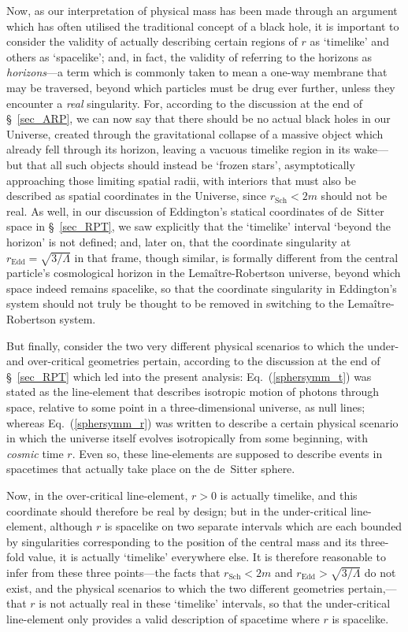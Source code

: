 Now, as our interpretation of physical mass has been made through an argument which has often utilised the traditional concept of a black hole, it is important to consider the validity of actually describing certain regions of $r$ as `timelike' and others as `spacelike'; and, in fact, the validity of referring to the horizons as \textit{horizons}---a term which is commonly taken to mean a one-way membrane that may be traversed, beyond which particles must be drug ever further, unless they encounter a \textit{real} singularity. For, according to the discussion at the end of \S~\ref{sec_ARP}, we can now say that there should be no actual black holes in our Universe, created through the gravitational collapse of a massive object which already fell through its horizon, leaving a vacuous timelike region in its wake---but that all such objects should instead be `frozen stars', asymptotically approaching those limiting spatial radii, with interiors that must also be described as spatial coordinates in the Universe, since $r_{\mathrm{Sch}}<2m$ should not be real. As well, in our discussion of Eddington's statical coordinates of de~Sitter space in \S~\ref{sec_RPT}, we saw explicitly that the `timelike' interval `beyond the horizon' is not defined; and, later on, that the coordinate singularity at $r_{\mathrm{Edd}}=\sqrt{3/\Lambda}$ in that frame, though similar, is formally different from the central particle's cosmological horizon in the Lema\^{i}tre-Robertson universe, beyond which space indeed remains spacelike, so that the coordinate singularity in Eddington's system should not truly be thought to be removed in switching to the Lema\^{i}tre-Robertson system. 

But finally, consider the two very different physical scenarios to which the under- and over-critical geometries pertain, according to the discussion at the end of \S~\ref{sec_RPT} which led into the present analysis: Eq.~(\ref{sphersymm_t}) was stated as the line-element that describes isotropic motion of photons through space, relative to some point in a three-dimensional universe, as null lines; whereas Eq.~(\ref{sphersymm_r}) was written to describe a certain physical scenario in which the universe itself evolves isotropically from some beginning, with \textit{cosmic} time $r$. Even so, these line-elements are supposed to describe events in spacetimes that actually take place on the de~Sitter sphere. 

Now, in the over-critical line-element, $r>0$ is actually timelike, and this coordinate should therefore be real by design; but in the under-critical line-element, although $r$ is spacelike on two separate intervals which are each bounded by singularities corresponding to the position of the central mass and its three-fold value, it is actually `timelike' everywhere else. It is therefore reasonable to infer from these three points---the facts that $r_{\mathrm{Sch}}<2m$ and $r_{\mathrm{Edd}}>\sqrt{3/\Lambda}$ do not exist, and the physical scenarios to which the two different geometries pertain,---that $r$ is not actually real in these `timelike' intervals, so that the under-critical line-element only provides a valid description of spacetime where $r$ is spacelike. 

